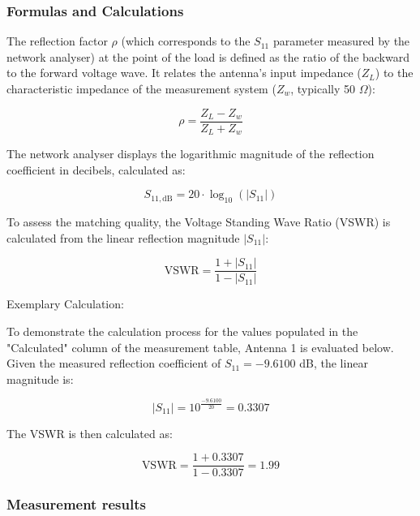 \subsubsection{Formulas and Calculations}

The reflection factor $\rho$ (which corresponds to the $S_{11}$ parameter measured by the network analyser) at the point of the load is defined as the ratio of the backward to the forward voltage wave. It relates the antenna's input impedance ($Z_L$) to the characteristic impedance of the measurement system ($Z_w$, typically 50 $\Omega$):

\begin{equation}
    \rho = \frac{Z_L - Z_w}{Z_L + Z_w}
\end{equation}

The network analyser displays the logarithmic magnitude of the reflection coefficient in decibels, calculated as:

\begin{equation}
    S_{11,\text{dB}} = 20 \cdot \log_{10}(|S_{11}|)
\end{equation}

To assess the matching quality, the Voltage Standing Wave Ratio (VSWR) is calculated from the linear reflection magnitude $|S_{11}|$:

\begin{equation}
    \text{VSWR} = \frac{1 + |S_{11}|}{1 - |S_{11}|}
\end{equation}

Exemplary Calculation:

To demonstrate the calculation process for the values populated in the "Calculated" column of the measurement table, Antenna 1 is evaluated below. Given the measured reflection coefficient of $S_{11} = -9.6100$ dB, the linear magnitude is:

\begin{equation}
    |S_{11}| = 10^{\frac{-9.6100}{20}} = 0.3307
\end{equation}

The VSWR is then calculated as:

\begin{equation}
    \text{VSWR} = \frac{1 + 0.3307}{1 - 0.3307} = 1.99
\end{equation}

\subsubsection{Measurement results}

